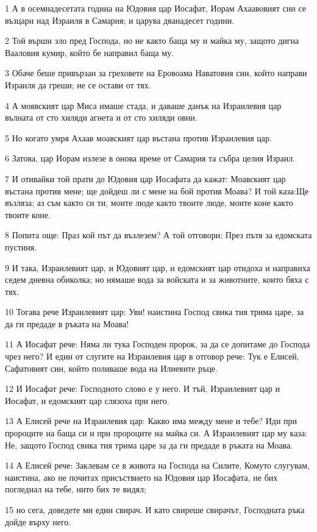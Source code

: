 \par 1 А в осемнадесетата година на Юдовия цар Иосафат, Иорам Ахаавовият син се възцари над Израиля в Самария; и царува дванадесет години.
\par 2 Той върши зло пред Господа, но не както баща му и майка му, защото дигна Вааловия кумир, който бе направил баща му.
\par 3 Обаче беше привързан за греховете на Еровоама Наватовия син, който направи Израиля да греши; не се остави от тях.
\par 4 А моявският цар Миса имаше стада, и даваше данък на Израилевия цар вълната от сто хиляди агнета и от сто хиляди овни.
\par 5 Но когато умря Ахаав моавският цар въстана против Израилевия цар.
\par 6 Затова, цар Иорам излезе в онова време от Самария та събра целия Израил.
\par 7 И отивайки той прати до Юдовия цар Иосафата да кажат: Моавският цар въстана против мене; ще дойдеш ли с мене на бой против Моава? И той каза:Ще възляза; аз съм както си ти, моите люде както твоите люде, моите коне както твоите коне.
\par 8 Попита още: Праз кой път да възлезем? А той отговори: През пътя за едомската пустиня.
\par 9 И така, Израилевият цар, и Юдовият цар, и едомският цар отидоха и направиха седем дневна обиколка; но нямаше вода за войската и за животните, които бяха с тях.
\par 10 Тогава рече Израилевият цар: Уви! наистина Господ свика тия трима царе, за да ги предаде в ръката на Моава!
\par 11 А Иосафат рече: Няма ли тука Господен пророк, за да се допитаме до Господа чрез него? И един от слугите на Израилевия цар в отговор рече: Тук е Елисей, Сафатовият син, който поливаше вода на Илиевите ръце.
\par 12 И Иосафат рече: Господното слово е у него. И тъй, Израилевият цар и Иосафат, и едомският цар слязоха при него.
\par 13 А Елисей рече на Израилевия цар: Какво има между мене и тебе? Иди при пророците на баща си и при пророците на майка си. А Израилевият цар му каза: Не, защото Господ свика тия трима царе за да ги предаде в ръката на Моава.
\par 14 А Елисей рече: Заклевам се в живота на Господа на Силите, Комуто слугувам, наистина, ако не почитах присъствието на Юдовия цар Иосафата, не бих погледнал на тебе, нито бих те видял;
\par 15 но сега, доведете ми един свирач. И като свиреше свирачът, Господната ръка дойде върху него.

